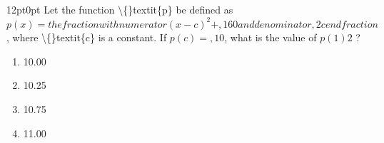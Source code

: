 \documentclass[11pt, twocolumn]{article}
\newcounter{questionnum}
\begin{document}
\vspace{6pt}\noindent
\begin{minipage}{\columnwidth}\raggedright
\noindent{}\par\vspace{8pt}
\begin{adjustwidth}{12pt}{0pt}
Let the function \textbackslash\{\}textit\{p\} be defined as $p(x) = the fraction with numerator (x - c )^{2} +, 160 and denominator, 2 c end fraction$, where \textbackslash\{\}textit\{c\} is a constant. If $p(c) =, 10$, what is the value of $p(1)2$ ?
\begin{enumerate}[label=\Alph*),leftmargin=18pt,topsep=3pt,itemsep=2pt]
  \item 10.00
  \item 10.25
  \item 10.75
  \item 11.00
\end{enumerate}
\end{adjustwidth}
\end{minipage}\par
\end{document}
